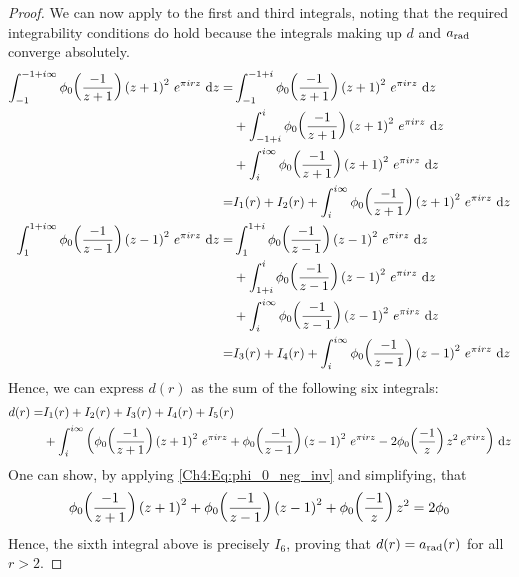 \begin{proof}
    We can now apply  to the first and third integrals, noting that the required integrability conditions do hold because the integrals making up $d$ and $a_{\operatorname{rad}}$ converge absolutely.
    \begin{align*}
        \int_{-1}^{-1 + i \infty} \phi_0\of{\frac{-1}{z + 1}} \parenth{z + 1}^2 \, e^{\pi i r z} \, \diff{z}
        =& \int_{-1}^{-1 + i} \phi_0\of{\frac{-1}{z + 1}} \parenth{z + 1}^2 \, e^{\pi i r z} \, \diff{z} \\
        &+ \int_{-1 + i}^{i} \phi_0\of{\frac{-1}{z + 1}} \parenth{z + 1}^2 \, e^{\pi i r z} \, \diff{z} \\
        &+ \int_{i}^{i \infty} \phi_0\of{\frac{-1}{z + 1}} \parenth{z + 1}^2 \, e^{\pi i r z} \, \diff{z} \\
        =& I_1(r) + I_2(r) + \int_{i}^{i \infty} \phi_0\of{\frac{-1}{z + 1}} \parenth{z + 1}^2 \, e^{\pi i r z} \, \diff{z} \\
        \int_{1}^{1 + i \infty} \phi_0\of{\frac{-1}{z - 1}} \parenth{z - 1}^2 \, e^{\pi i r z} \, \diff{z}
        =& \int_{1}^{1 + i} \phi_0\of{\frac{-1}{z - 1}} \parenth{z - 1}^2 \, e^{\pi i r z} \, \diff{z} \\
        &+ \int_{1 + i}^{i} \phi_0\of{\frac{-1}{z - 1}} \parenth{z - 1}^2 \, e^{\pi i r z} \, \diff{z} \\
        &+ \int_{i}^{i \infty} \phi_0\of{\frac{-1}{z - 1}} \parenth{z - 1}^2 \, e^{\pi i r z} \, \diff{z} \\
        =& I_3(r) + I_4(r) + \int_{i}^{i \infty} \phi_0\of{\frac{-1}{z - 1}} \parenth{z - 1}^2 \, e^{\pi i r z} \, \diff{z}
    \end{align*}
    Hence, we can express $d(r)$ as the sum of the following six integrals:
    \begin{align*}
        d(r) =& I_1(r) + I_2(r) + I_3(r) + I_4(r) + I_5(r) \\
        &+ \int_{i}^{i\infty} \left( 
            \phi_0\!\left( \frac{-1}{z + 1} \right) \left( z + 1 \right)^2 \, e^{\pi i r z} +
            \phi_0\!\left( \frac{-1}{z - 1} \right) \left( z - 1 \right)^2 \, e^{\pi i r z} - 2
            \phi_0\!\left( \frac{-1}{z} \right) z^2 \, e^{\pi i r z}
         \right) \, \operatorname{d}\!{z}
    \end{align*}
    One can show, by applying \eqref{Ch4:Eq:phi_0_neg_inv} and simplifying, that
    \begin{align*}
        \phi_0\!\left( \frac{-1}{z + 1} \right) \left( z + 1 \right)^2 +
        \phi_0\!\left( \frac{-1}{z - 1} \right) \left( z - 1 \right)^2 +
        \phi_0\!\left( \frac{-1}{z} \right) z^2 = 2\phi_0
    \end{align*}
    Hence, the sixth integral above is precisely $I_6$, proving that $d(r) = a_{\operatorname{rad}}(r)$ for all $r > 2$.
\end{proof}

